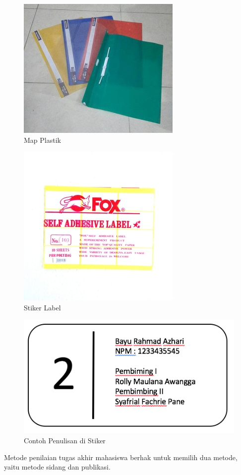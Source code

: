 \begin{figure}[ht]
	\centerline{\includegraphics[width=.25\textwidth]{figures/mapplastik}}
	\caption{Map Plastik}
	\label{mapplastik}
	\end{figure}
	
	\begin{figure}[ht]
		\centerline{\includegraphics[width=.25\textwidth]{figures/label}}
		\caption{Stiker Label}
		\label{label}
		\end{figure}

		\begin{figure}[ht]
			\centerline{\includegraphics[width=.25\textwidth]{figures/labelcon}}
			\caption{Contoh Penulisan di Stiker}
			\label{labelcon}
			\end{figure}


Metode penilaian tugas akhir mahasiswa berhak untuk memilih dua metode, yaitu metode sidang dan publikasi.
